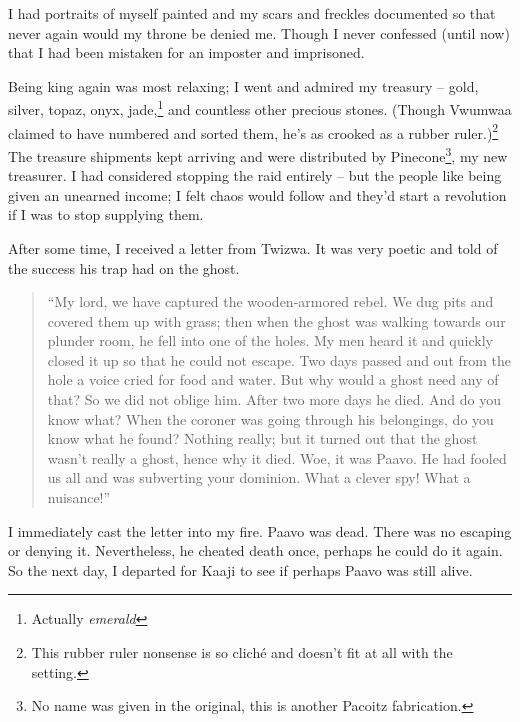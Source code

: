 I had portraits of myself painted and my scars and freckles documented so that never again would my throne be denied me. Though I never confessed (until now) that I had been mistaken for an imposter and imprisoned.

Being king again was most relaxing; I went and admired my treasury -- gold, silver, topaz, onyx, jade,\footnote{Actually \emph{emerald}} and countless other precious stones. (Though Vwumwaa claimed to have numbered and sorted them, he's as crooked as a rubber ruler.)\footnote{This rubber ruler nonsense is so clich\'{e} and doesn't fit at all with the setting.} The treasure shipments kept arriving and were distributed by Pinecone\footnote{No name was given in the original, this is another Pacoitz fabrication.}, my new treasurer. I had considered stopping the raid entirely -- but the people like being given an unearned income; I felt chaos would follow and they'd start a revolution if I was to stop supplying them.

After some time, I received a letter from Twizwa. It was very poetic and told of the success his trap had on the ghost.

\begin{quote}``My lord, we have captured the wooden-armored rebel. We dug pits and covered them up with grass; then when the ghost was walking towards our plunder room, he fell into one of the holes. My men heard it and quickly closed it up so that he could not escape. Two days passed and out from the hole a voice cried for food and water. But why would a ghost need any of that? So we did not oblige him. After two more days he died. And do you know what? When the coroner was going through his belongings, do you know what he found? Nothing really; but it turned out that the ghost wasn't really a ghost, hence why it died. Woe, it was Paavo. He had fooled us all and was subverting your dominion. What a clever spy! What a nuisance!''
\end{quote}

I immediately cast the letter into my fire. Paavo was dead. There was no escaping or denying it. Nevertheless, he cheated death once, perhaps he could do it again. So the next day, I departed for Kaaji to see if perhaps Paavo was still alive.
